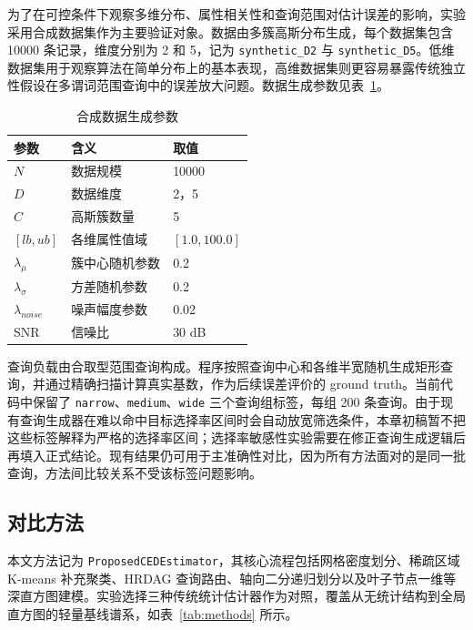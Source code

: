 为了在可控条件下观察多维分布、属性相关性和查询范围对估计误差的影响，实验采用合成数据集作为主要验证对象。数据由多簇高斯分布生成，每个数据集包含 10000 条记录，维度分别为 2 和 5，记为 \texttt{synthetic\_D2} 与 \texttt{synthetic\_D5}。低维数据集用于观察算法在简单分布上的基本表现，高维数据集则更容易暴露传统独立性假设在多谓词范围查询中的误差放大问题。数据生成参数见表~\ref{tab:data-config}。

\begin{table}[htbp]
  \centering
  \caption{合成数据生成参数}
  \label{tab:data-config}
  \begin{tabular}{lll}
    \hline
    参数 & 含义 & 取值 \\
    \hline
    $N$ & 数据规模 & 10000 \\
    $D$ & 数据维度 & 2，5 \\
    $C$ & 高斯簇数量 & 5 \\
    $[lb, ub]$ & 各维属性值域 & $[1.0, 100.0]$ \\
    $\lambda_{\mu}$ & 簇中心随机参数 & 0.2 \\
    $\lambda_{\sigma}$ & 方差随机参数 & 0.2 \\
    $\lambda_{noise}$ & 噪声幅度参数 & 0.02 \\
    SNR & 信噪比 & 30 dB \\
    \hline
  \end{tabular}
\end{table}

查询负载由合取型范围查询构成。程序按照查询中心和各维半宽随机生成矩形查询，并通过精确扫描计算真实基数，作为后续误差评价的 ground truth。当前代码中保留了 \texttt{narrow}、\texttt{medium}、\texttt{wide} 三个查询组标签，每组 200 条查询。由于现有查询生成器在难以命中目标选择率区间时会自动放宽筛选条件，本章初稿暂不把这些标签解释为严格的选择率区间；选择率敏感性实验需要在修正查询生成逻辑后再填入正式结论。现有结果仍可用于主准确性对比，因为所有方法面对的是同一批查询，方法间比较关系不受该标签问题影响。

\subsection{对比方法}

本文方法记为 \texttt{ProposedCEDEstimator}，其核心流程包括网格密度划分、稀疏区域 K-means 补充聚类、HRDAG 查询路由、轴向二分递归划分以及叶子节点一维等深直方图建模。实验选择三种传统统计估计器作为对照，覆盖从无统计结构到全局直方图的轻量基线谱系，如表~\ref{tab:methods} 所示。

